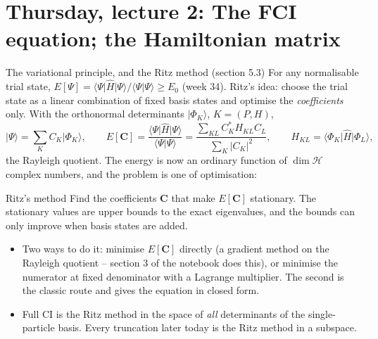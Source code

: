 \documentclass[aspectratio=169,10pt]{beamer}
\newcommand{\ket}[1]{\vert #1\rangle}
\newcommand{\bra}[1]{\langle #1\vert}
\newcommand{\braket}[2]{\langle #1\vert #2\rangle}
\begin{document}
\section{Thursday, lecture 2: The FCI equation; the Hamiltonian matrix}

\begin{frame}{The variational principle, and the Ritz method (section 5.3)}
  \small
  For any normalisable trial state, $E[\Psi]=\bra{\Psi}\hat{H}\ket{\Psi}/\braket{\Psi}{\Psi}\ge E_0$ (week 34). Ritz's idea: choose the trial state as a \alert{linear combination of fixed basis states} and optimise the \emph{coefficients} only. With the orthonormal determinants $\ket{\Phi_K}$, $K=(P,H)$,
  \[
    \ket{\Psi}=\sum_KC_K\ket{\Phi_K},
    \qquad
    E[\bm{C}]=\frac{\bra{\Psi}\hat{H}\ket{\Psi}}{\braket{\Psi}{\Psi}}
    =\frac{\sum_{KL}C_K^{*}H_{KL}C_L}{\sum_K|C_K|^2},
    \qquad
    H_{KL}=\bra{\Phi_K}\hat{H}\ket{\Phi_L},
  \]
  the \alert{Rayleigh quotient}. The energy is now an ordinary function of $\dim\mathcal{H}$ complex numbers, and the problem is one of optimisation:
  \begin{block}{Ritz's method}
    Find the coefficients $\bm{C}$ that make $E[\bm{C}]$ stationary. The stationary values are upper bounds to the exact eigenvalues, and the bounds can only improve when basis states are added.
  \end{block}
  \begin{itemize}
    \item Two ways to do it: minimise $E[\bm{C}]$ directly (a gradient method on the Rayleigh quotient -- section 3 of the notebook does this), or minimise the numerator at fixed denominator with a \alert{Lagrange multiplier}. The second is the classic route and gives the equation in closed form.
    \item Full CI is the Ritz method in the space of \emph{all} determinants of the single-particle basis. Every truncation later today is the Ritz method in a subspace.
  \end{itemize}
\end{frame}
\end{document}
